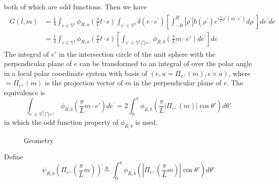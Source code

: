 \documentclass[11pt]{amsart}
\begin{document}
both of which are odd functions.
Then we have
\begin{multline*}
\begin{split}
G(l, m) &=\frac{1}{4}
 \int_{e \in \mathbb{S}^{2}} \phi_{R,a}\left(\frac{\pi}{L}l\cdot e\right) \int_{e^{\prime} \in \mathbb{S}^{2}} \delta\left(e \cdot e^{\prime}\right)  \left[\int_{-R}^{R}\left|\rho^{\prime}\right| b\left(\rho^{\prime}\right) e^{i \frac{\pi}{L}\rho^{\prime}\left(m \cdot e^{\prime}\right)} d \rho^{\prime}\right] d e ^{\prime}d e \\
 & = \frac{1}{4} \int_{e \in \mathbb{S}^{2}} \phi_{R,a}\left(\frac{\pi}{L}l\cdot e\right) 
 \left[ \int_{e^{\prime} \in \mathbb{S}^{2} \bigcap e^{\perp}}  \phi_{R,b}\left(\frac{\pi}{L}m\cdot e'\right)d e^{\prime}\right]d e
\end{split}
\end{multline*}
The integral of $e'$ in the intersection circle of the unit sphere with the perpendicular plane of  $e$ can be transformed to an integral of over the polar angle in a local polar coordinate system with basis of $(e, u=\Pi_{e^\perp}(m), e\times u)$, where $=\Pi_{e^\perp}(m)$ is the projection vector of $m$ in the perpendicular plane of $e$. The equivalence is
\begin{equation*}
 \int_{e^{\prime} \in \mathbb{S}^{2} \bigcap e^{\perp}}  \phi_{R,b}\left(\frac{\pi}{L}m\cdot e'\right)d e^{\prime}
 = 2 \int_0^{\pi} \phi_{R,b}\left(\frac{\pi}{L} |\Pi_{e^{\perp}}(m)| \cos \theta' \right) d \theta' 
 \end{equation*}
 in which the odd function property of $\phi_{R,b}$ is used. 
\begin{figure}[tbp]
\begin{center}
\caption{Geometry}
\label{fig:local_polar_coordinate}
\end{center}
\end{figure}
Define
\begin{equation*}
\psi_{R,b}\left(\Pi_{e^{\perp}}\left(\frac{\pi}{L}m \right) \right ) \triangleq \int_0^{\pi}  \phi_{R,b}\left( \left\vert\Pi_{e^{\perp}}\left(\frac{\pi}{L}m \right) \right \vert \cos \theta' \right) d \theta' 
\end{equation*}
\end{document}
